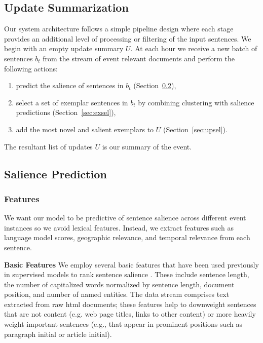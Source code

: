 \subsection{Update Summarization}

Our system architecture follows a simple pipeline design where each
stage provides an additional level of processing or filtering of the input
sentences.
We begin with an empty update summary $U$.
At each hour we receive a new batch of sentences $b_t$ from the stream
of event relevant documents
and perform the following actions:
\begin{enumerate}[nosep]
  \item predict the salience of sentences in $b_t$ (Section~\ref{sec:salpred}),
  \item select a set of exemplar sentences in $b_t$ by combining 
      clustering with 
      salience predictions (Section~\ref{sec:exsel}),
  \item add the most novel and salient exemplars 
      to $U$ (Section~\ref{sec:upsel}).
\end{enumerate}
The resultant list of updates $U$ is our summary of the event.


\subsection{Salience Prediction}
\label{sec:salpred}

%

\subsubsection{Features}
\label{sec:features}
We want our model to be predictive of sentence salience across different event instances so we avoid lexical features.  Instead, we extract features such as language model scores, geographic relevance, and temporal relevance from each sentence.  

\textbf{Basic Features}
We employ several basic features that have been used previously in supervised models to rank sentence salience \cite{kupiec1995trainable,conroy2001using}. These include sentence length, the number of capitalized words normalized by sentence length, document position, and number of named entities.  
The data stream comprises text extracted from raw html documents;
these features help to downweight sentences that are not 
content (e.g. web page titles, links to other content) or
more heavily weight important sentences (e.g., that appear in
prominent positions such as paragraph initial or article initial).


